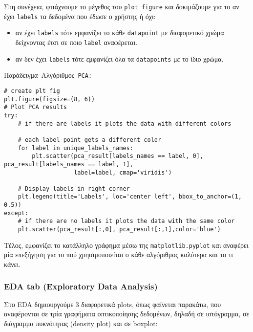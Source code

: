 \documentclass[a4paper,12pt]{article}
\begin{document}
Στη συνέχεια, φτιάχνουμε το μέγεθος του \texttt{plot figure} και δοκιμάζουμε για το αν έχει \texttt{labels} τα δεδομένα που έδωσε ο χρήστης ή όχι:
\begin{itemize}
\item αν έχει \texttt{labels} τότε εμφανίζει το κάθε \texttt{datapoint} με διαφορετικό χρώμα δείχνοντας έτσι σε ποιο \texttt{label} αναφέρεται.
\item αν δεν έχει \texttt{labels} τότε εμφανίζει όλα τα \texttt{datapoints} με το ίδιο χρώμα.
\end{itemize}
\mbox{Παράδειγμα Αλγόριθμος  \texttt{PCA:}}
\begin{lstlisting}
# create plt fig
plt.figure(figsize=(8, 6))   
# Plot PCA results
try:
    # if there are labels it plots the data with different colors
    
    # each label point gets a different color
    for label in unique_labels_names:
        plt.scatter(pca_result[labels_names == label, 0], pca_result[labels_names == label, 1], 
                    label=label, cmap='viridis')
        
    # Display labels in right corner
    plt.legend(title='Labels', loc='center left', bbox_to_anchor=(1, 0.5))
except:
    # if there are no labels it plots the data with the same color
    plt.scatter(pca_result[:,0], pca_result[:,1],color='blue')
\end{lstlisting}
Τέλος, εμφανίζει το κατάλληλο γράφημα μέσω της \texttt{matplotlib.pyplot} και αναφέρει μία επεξήγηση για το πού χρησιμοποιείται ο κάθε αλγόριθμος καλύτερα και το τι κάνει.


\newpage
\subsubsection{ EDA tab (Exploratory Data Analysis)}
Στο EDA δημιουργούμε 3 διαφορετικά plots, όπως φαίνεται παρακάτω, που αναφέρονται σε τρία γραφήματα οπτικοποίησης δεδομένων, δηλαδή σε ιστόγραμμα, σε διάγραμμα πυκνότητας (density plot) και σε boxplot:
\end{document}
